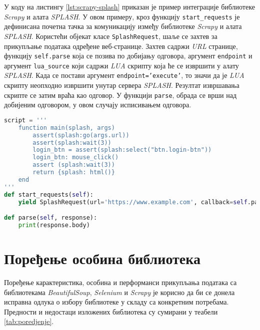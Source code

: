 \documentclass[12pt,oneside]{memoir}
\begin{document}
У коду на листингу \ref{lst:scrapy-splash} приказан је пример интеграције библиотеке \textit{Scrapy} и алата \textit{SPLASH}. У овом примеру, кроз функцију \texttt{start\_requests} је дефинисана почетна тачка за комуникацију између библиотеке \textit{Scrapy} и алата \textit{SPLASH}. Користећи објекат класе \texttt{SplashRequest}, шаље се захтев за прикупљање података одређене веб-странице. Захтев садржи \textit{URL} странице, функцију \texttt{self.parse} која се позива по добијању одговора, аргумент \texttt{endpoint} и аргумент \texttt{lua\_source} који садржи \textit{LUA} скрипту која ће се извршити у алату \textit{SPLASH}. Када се постави аргумент \texttt{endpoint='execute'}, то значи да је \textit{LUA} скрипту неопходно извршити унутар сервера \textit{SPLASH}. Резултат извршавања скрипте се затим враћа као одговор. У функцији \texttt{parse}, обрада се врши над добијеним одговором, у овом случају исписивањем одговора. 
\begin{lstlisting}[language=Python, caption={Пример интеграције библиотеке \textit{Scrapy} и алата \textit{SPLASH}}, label={lst:scrapy-splash}]
script = '''
    function main(splash, args)
        assert(splash:go(args.url))
        assert(splash:wait(3))
        login_btn = assert(splash:select("btn.login-btn"))
        login_btn: mouse_click()
        assert (splash:wait(3))
        return {splash: html()}
    end
'''
def start_requests(self):
    yield SplashRequest(url='https://www.example.com', callback=self.parse, endpoint='execute', args {'lua_source':self.script})

def parse(self, response):
    print(response.body)
\end{lstlisting}

\chapter{Поређење особина библиотека}
\label{chp:poredjenje}

Поређење карактеристика, особина и перформанси прикупљања података са библиотекама \textit{BeautifulSoup}, \textit{Selenium} и \textit{Scrapy} је корисно да би се донела исправна одлука о избору библиотеке у складу са конкретним потребама. Предности и недостаци изложених библиотека су сумирани у теабели \ref{tab:poredjenje}.
\end{document}
